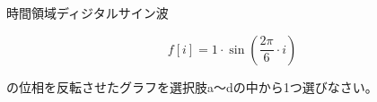 時間領域ディジタルサイン波 

\[
f[i] = 1 \cdot \sin \left ( \frac{2 \pi}{6}  \cdot i \right )
\]

\noindent の位相を反転させたグラフを選択肢a〜dの中から1つ選びなさい。
